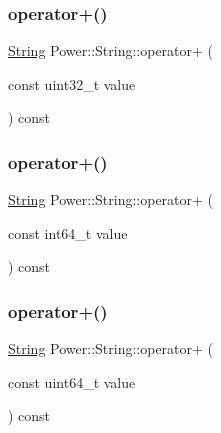 \mbox{\label{class_power_1_1_string_afc7e926554a6e77bd4e34e850f08fa35}} 
\subsubsection{\texorpdfstring{operator+()}{operator+()}\hspace{0.1cm}{\footnotesize\ttfamily [7/11]}}
{\footnotesize\ttfamily \hyperlink{class_power_1_1_string}{String} Power\+::\+String\+::operator+ (\begin{DoxyParamCaption}\item[{const uint32\+\_\+t}]{value }\end{DoxyParamCaption}) const\hspace{0.3cm}{\ttfamily [inline]}}

\mbox{\label{class_power_1_1_string_a6786c4c855394ed972fcee194f5b0b59}} 
\subsubsection{\texorpdfstring{operator+()}{operator+()}\hspace{0.1cm}{\footnotesize\ttfamily [8/11]}}
{\footnotesize\ttfamily \hyperlink{class_power_1_1_string}{String} Power\+::\+String\+::operator+ (\begin{DoxyParamCaption}\item[{const int64\+\_\+t}]{value }\end{DoxyParamCaption}) const\hspace{0.3cm}{\ttfamily [inline]}}

\mbox{\label{class_power_1_1_string_aeff2ea13da477a4e313cdac2fcea1856}} 
\subsubsection{\texorpdfstring{operator+()}{operator+()}\hspace{0.1cm}{\footnotesize\ttfamily [9/11]}}
{\footnotesize\ttfamily \hyperlink{class_power_1_1_string}{String} Power\+::\+String\+::operator+ (\begin{DoxyParamCaption}\item[{const uint64\+\_\+t}]{value }\end{DoxyParamCaption}) const\hspace{0.3cm}{\ttfamily [inline]}}

